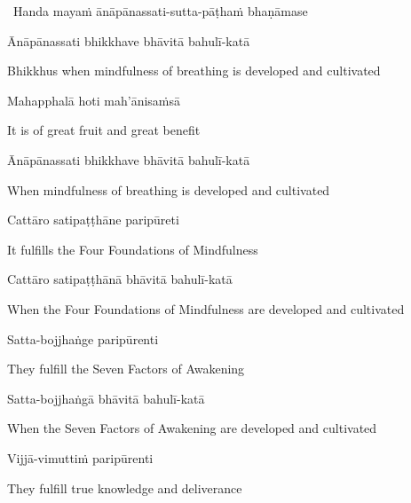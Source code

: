 \begin{leader}
  \anglebracketleft\ \hspace{-0.5mm}Handa mayaṁ ānāpānassati-sutta-pāṭhaṁ bhaṇāmase \hspace{-0.5mm}\anglebracketright\
\end{leader}

Ānāpānassati bhikkhave bhāvitā bahulī-katā

\begin{english}
  Bhikkhus when mindfulness of breathing is developed and cultivated
\end{english}

Mahapphalā hoti mah'ānisaṁsā

\begin{english}
  It is of great fruit and great benefit
\end{english}

Ānāpānassati bhikkhave bhāvitā bahulī-katā

\begin{english}
  When mindfulness of breathing is developed and cultivated
\end{english}

Cattāro satipaṭṭhāne paripūreti

\begin{english}
  It fulfills the Four Foundations of Mindfulness
\end{english}

Cattāro satipaṭṭhānā bhāvitā bahulī-katā

\begin{english-hang}
  When the Four Foundations of Mindfulness are developed and cultivated
\end{english-hang}

Satta-bojjhaṅge paripūrenti

\begin{english}
  They fulfill the Seven Factors of Awakening
\end{english}

Satta-bojjhaṅgā bhāvitā bahulī-katā

\begin{english}
  When the Seven Factors of Awakening are developed and cultivated
\end{english}

Vijjā-vimuttiṁ paripūrenti

\begin{english}
  They fulfill true knowledge and deliverance
\end{english}

